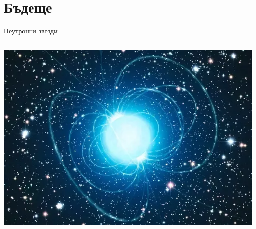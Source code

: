 \documentclass[10pt,a4paper]{beamer}
\begin{document}
    \section{ Бъдеще }
        
        \begin{frame}{}
            \tableofcontents[currentsection]
        \end{frame}
        
        \begin{frame}{ Неутронни звезди }
                \begin{columns}
                    \begin{column}{0.8\textwidth}
                            \includegraphics[width=\textwidth]{images/neutron_star.png}
                    \end{column}
                \end{columns}
        \end{frame}
    
\end{document}

